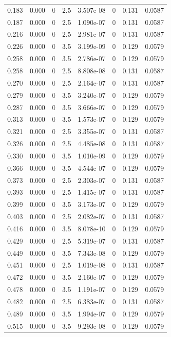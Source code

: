 \documentclass[preview]{standalone}
\begin{document}
{{\begin{tabular}{L{1.2cm}C{1.2cm} C{0.3cm}C{0.5cm} C{1.4cm}C{1.4cm} C{1.4cm}C{1.4cm}}
  0.183  &  0.000  & 0     & 2.5 &  3.507e-08  & 0  & 0.131 &  0.0587   \\ 
  0.187  &  0.000  & 0     & 2.5 &  1.090e-07  & 0  & 0.131 &  0.0587   \\ 
  0.216  &  0.000  & 0     & 2.5 &  2.981e-07  & 0  & 0.131 &  0.0587   \\ 
  0.226  &  0.000  & 0     & 3.5 &  3.199e-09  & 0  & 0.129 &  0.0579   \\ 
  0.258  &  0.000  & 0     & 3.5 &  2.786e-07  & 0  & 0.129 &  0.0579   \\ 
  0.258  &  0.000  & 0     & 2.5 &  8.808e-08  & 0  & 0.131 &  0.0587   \\ 
  0.270  &  0.000  & 0     & 2.5 &  2.164e-07  & 0  & 0.131 &  0.0587   \\ 
  0.279  &  0.000  & 0     & 3.5 &  3.240e-07  & 0  & 0.129 &  0.0579   \\ 
  0.287  &  0.000  & 0     & 3.5 &  3.666e-07  & 0  & 0.129 &  0.0579   \\ 
  0.313  &  0.000  & 0     & 3.5 &  1.573e-07  & 0  & 0.129 &  0.0579   \\ 
  0.321  &  0.000  & 0     & 2.5 &  3.355e-07  & 0  & 0.131 &  0.0587   \\ 
  0.326  &  0.000  & 0     & 2.5 &  4.485e-08  & 0  & 0.131 &  0.0587   \\ 
  0.330  &  0.000  & 0     & 3.5 &  1.010e-09  & 0  & 0.129 &  0.0579   \\ 
  0.366  &  0.000  & 0     & 3.5 &  4.544e-07  & 0  & 0.129 &  0.0579   \\ 
  0.373  &  0.000  & 0     & 2.5 &  2.303e-07  & 0  & 0.131 &  0.0587   \\ 
  0.393  &  0.000  & 0     & 2.5 &  1.415e-07  & 0  & 0.131 &  0.0587   \\ 
  0.399  &  0.000  & 0     & 3.5 &  3.173e-07  & 0  & 0.129 &  0.0579   \\ 
  0.403  &  0.000  & 0     & 2.5 &  2.082e-07  & 0  & 0.131 &  0.0587   \\ 
  0.416  &  0.000  & 0     & 3.5 &  8.078e-10  & 0  & 0.129 &  0.0579   \\ 
  0.429  &  0.000  & 0     & 2.5 &  5.319e-07  & 0  & 0.131 &  0.0587   \\ 
  0.449  &  0.000  & 0     & 3.5 &  7.343e-08  & 0  & 0.129 &  0.0579   \\ 
  0.451  &  0.000  & 0     & 2.5 &  1.019e-08  & 0  & 0.131 &  0.0587   \\ 
  0.472  &  0.000  & 0     & 3.5 &  2.160e-07  & 0  & 0.129 &  0.0579   \\ 
  0.478  &  0.000  & 0     & 3.5 &  1.191e-07  & 0  & 0.129 &  0.0579   \\ 
  0.482  &  0.000  & 0     & 2.5 &  6.383e-07  & 0  & 0.131 &  0.0587   \\ 
  0.489  &  0.000  & 0     & 3.5 &  1.994e-07  & 0  & 0.129 &  0.0579   \\ 
  0.515  &  0.000  & 0     & 3.5 &  9.293e-08  & 0  & 0.129 &  0.0579   \\ 
\hline 
\end{tabular} 

}}
\end{document}
